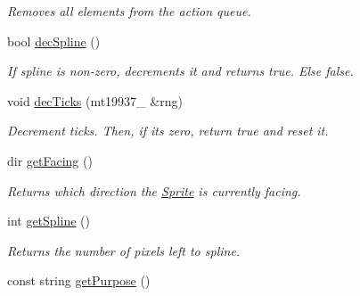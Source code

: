 \begin{DoxyCompactItemize}
\begin{DoxyCompactList}\small\item\em Removes all elements from the action queue. \end{DoxyCompactList}\item 
bool \hyperlink{class_sprite_af880e3cfcd03b6de68171eef82dc6a69}{dec\+Spline} ()\hypertarget{class_sprite_af880e3cfcd03b6de68171eef82dc6a69}{}\label{class_sprite_af880e3cfcd03b6de68171eef82dc6a69}

\begin{DoxyCompactList}\small\item\em If spline is non-\/zero, decrements it and returns true. Else false. \end{DoxyCompactList}\item 
void \hyperlink{class_sprite_a8f06e4e0ea4c640c0d9685a1bf53452b}{dec\+Ticks} (mt19937\+\_ \&rng)\hypertarget{class_sprite_a8f06e4e0ea4c640c0d9685a1bf53452b}{}\label{class_sprite_a8f06e4e0ea4c640c0d9685a1bf53452b}

\begin{DoxyCompactList}\small\item\em Decrement ticks. Then, if it\textquotesingle{}s zero, return true and reset it. \end{DoxyCompactList}\item 
dir \hyperlink{class_sprite_a6bf9e87449da385e99c02586eadf5de6}{get\+Facing} ()\hypertarget{class_sprite_a6bf9e87449da385e99c02586eadf5de6}{}\label{class_sprite_a6bf9e87449da385e99c02586eadf5de6}

\begin{DoxyCompactList}\small\item\em Returns which direction the \hyperlink{class_sprite}{Sprite} is currently facing. \end{DoxyCompactList}\item 
int \hyperlink{class_sprite_aad5e5beb45ec5eae6fe8d096d5ebef68}{get\+Spline} ()\hypertarget{class_sprite_aad5e5beb45ec5eae6fe8d096d5ebef68}{}\label{class_sprite_aad5e5beb45ec5eae6fe8d096d5ebef68}

\begin{DoxyCompactList}\small\item\em Returns the number of pixels left to spline. \end{DoxyCompactList}\item 
const string \hyperlink{class_sprite_ab130d27f349a15e736e2f60c9a20ca0d}{get\+Purpose} ()\hypertarget{class_sprite_ab130d27f349a15e736e2f60c9a20ca0d}{}\label{class_sprite_ab130d27f349a15e736e2f60c9a20ca0d}


\end{DoxyCompactItemize}
